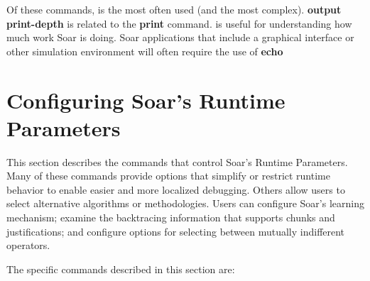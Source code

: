 Of these commands,  is the most often used (and the most 
complex).  \textbf{output print-depth} is related to the \textbf{print} command.  
is useful for understanding how much work Soar is doing. Soar applications that include a graphical interface or other
simulation environment will often require the use of \textbf{echo} 

\divider 


\divider 


\divider 


\divider 


\divider 


\divider 

\section{Configuring Soar's Runtime Parameters}
\label{RUNTIME}

This section describes the commands that control Soar's Runtime Parameters.
Many of these commands provide options that simplify or restrict 
runtime behavior to enable easier and more localized debugging.
Others allow users to select alternative algorithms or methodologies.
Users can configure Soar's learning mechanism; examine the
backtracing information that supports chunks and justifications;
and configure options for selecting between mutually indifferent operators.

The specific commands described in this section are:

